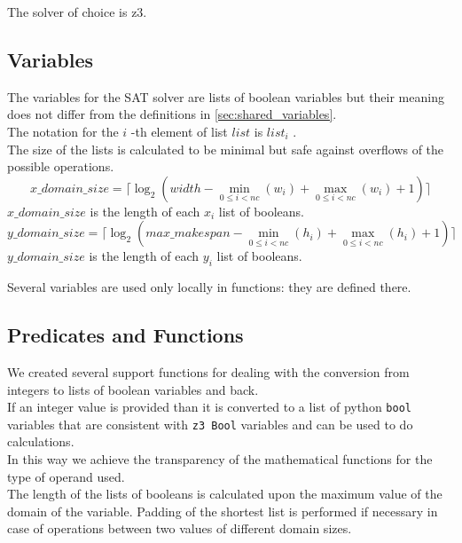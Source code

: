     The solver of choice is z3.


\subsection{Variables}\label{subsec:SAT_variables}
  The variables for the SAT solver are lists of boolean variables but their meaning does not differ from the 
  definitions in \ref{sec:shared_variables}.\\

  The notation for the \(i\) -th element of list 
  \(list\)  is \(list_i\) .\\

  The size of the lists is calculated to be minimal but safe against overflows of the possible operations.
  \begin{equation}
    x\_domain\_size = \lceil \log_2 (width - \min_{0 \leq i < nc} (w_i) + \max_{0 \leq i < nc}(w_i) + 1) \rceil
  \end{equation}
  \( x\_domain\_size \) is the length of each \(x_i\) list of booleans.
  \begin{equation}
    y\_domain\_size = \lceil \log_2 (max\_makespan - \min_{0 \leq i < nc} (h_i) + \max_{0 \leq i < nc}(h_i) + 1) \rceil
  \end{equation}
  \(y\_domain\_size\) is the length of each \(y_i\) list of booleans.

  Several variables are used only locally in functions: they are defined there.\\


\subsection{Predicates and Functions}\label{subsec:SAT_predicates}
  We created several support functions for dealing with the conversion from integers to lists of
  boolean variables and back.\\
  If an integer value is provided than it is converted to a list of python \texttt{bool} variables
  that are consistent with 
  \texttt{z3 Bool} variables and can be used to do calculations.\\
  In this way we achieve the transparency of the mathematical functions for the type of operand 
  used.\\
  The length of the lists of booleans is calculated upon the maximum value of the domain of the
  variable. Padding of the shortest list is performed if necessary in case of operations between
  two values of different domain sizes. \\

